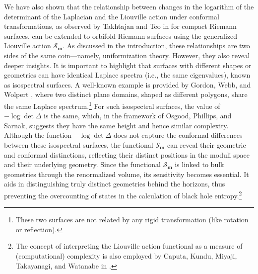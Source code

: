\documentclass[a4paper,11pt]{article}
\newcommand{\Gpotential}{\mathscr{S}}
\begin{document}
We have also shown that the relationship between changes in the logarithm of the determinant of the Laplacian and the Liouville action under conformal transformations, as observed by Takhtajan and Teo in \cite{Takhtajan_2003} for compact Riemann surfaces, can be extended to orbifold Riemann surfaces using the generalized Liouville action $\Gpotential_{\boldsymbol{m}}$. As discussed in the introduction, these relationships are two sides of the same coin—namely, uniformization theory. However, they also reveal deeper insights. It is important to highlight that surfaces with different shapes or geometries can have identical Laplace spectra (i.e., the same eigenvalues), known as isospectral surfaces. A well-known example is provided by Gordon, Webb, and Wolpert \cite{gordon1992one}, where two distinct plane domains, shaped as different polygons, share the same Laplace spectrum.\footnote{These two surfaces are not related by any rigid transformation (like rotation or reflection).} For such isospectral surfaces, the value of $-\log\det\Delta$ is the same, which, in the framework of Osgood, Phillips, and Sarnak, suggests they have the same height and hence similar complexity. Although the function $-\log\det\Delta$ does not capture the conformal differences between these isospectral surfaces, the functional  $\Gpotential_{\boldsymbol{m}}$ can reveal their geometric and conformal distinctions, reflecting their distinct positions in the moduli space and their underlying geometry. Since the functional $\Gpotential_{\boldsymbol{m}}$ is linked to bulk geometries through the renormalized volume, its sensitivity becomes essential. It aids in distinguishing truly distinct geometries behind the horizons, thus preventing the overcounting of states in the calculation of black hole entropy.\footnote{The concept of interpreting the Liouville action functional as a measure of (computational) complexity is also employed by Caputa, Kundu, Miyaji, Takayanagi, and Watanabe in \cite{caputa2017anti}.}
\end{document}
